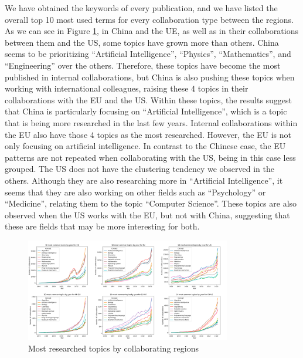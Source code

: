 We have obtained the keywords of every publication, and we have listed the overall top 10 most used terms for every collaboration type between the regions. As we can see in Figure \ref{fig:topics_all_relations}, in China and the UE, as well as in their collaborations between them and the US, some topics have grown more than others. China seems to be prioritizing “Artificial Intelligence”, “Physics”, “Mathematics”, and “Engineering” over the others. Therefore, these topics have become the most published in internal collaborations, but China is also pushing these topics when working with international colleagues, raising these 4 topics in their collaborations with the EU and the US. Within these topics, the results suggest that China is particularly focusing on “Artificial Intelligence”, which is a topic that is being more researched in the last few years. Internal collaborations within the EU also have those 4 topics as the most researched. However, the EU is not only focusing on artificial intelligence. In contrast to the Chinese case, the EU patterns are not repeated when collaborating with the US, being in this case less grouped. The US does not have the clustering tendency we observed in the others. Although they are also researching more in “Artificial Intelligence”, it seems that they are also working on other fields such as “Psychology” or “Medicine”, relating them to the topic “Computer Science”. These topics are also observed when the US works with the EU, but not with China, suggesting that these are fields that may be more interesting for both.

\begin{figure}[tb]
    \centering
    \includegraphics[width=0.8\textwidth]{images/topics_all_relations.png}
    \caption{Most researched topics by collaborating regions}
    \label{fig:topics_all_relations}
\end{figure}